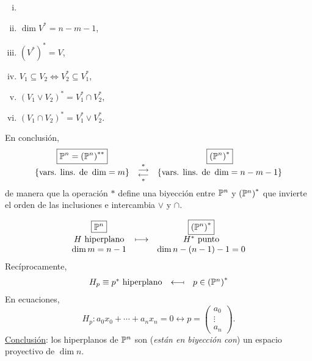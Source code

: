 \begin{obs}
    \begin{enumerate}[i)]
        \item []
        \item $\dim V^* = n-m-1$,
        \item $\left(V^*\right)^*=V$,
        \item $V_1 \subseteq V_2 \iff V_2^* \subseteq V_1^*$,
        \item $\left(V_1 \vee V_2 \right)^* = V_1^* \cap V_2^*$,
        \item $\left(V_1 \cap V_2 \right) ^*=V_1^* \vee V_2^*$.
    \end{enumerate}
    \vspace{0,3cm}
    \noindent En conclusión,
    \[
        \begin{array}{ccc}
             \boxed{\mathbb{P}^n = \left(\mathbb{P}^n\right)^{**}} & & \boxed{\left( \mathbb{P}^n \right)^*}\\
             \left\{\text{vars. lins. de }\dim = m \right\} & \substack{* \\ \longrightarrow \\  \longleftarrow \\ *} & \left\{\text{vars. lins. de }\dim = n-m-1 \right\}
        \end{array}
    \]
    de manera que la operación $*$ define una biyección entre $\mathbb{P}^n$ y $\left( \mathbb{P}^n \right)^*$ que invierte el orden de las inclusiones e intercambia $\vee$ y $\cap$.
\end{obs}
\begin{obs}
    \[
        \begin{array}{ccc}
             \boxed{\mathbb{P}^n} & & \boxed{\left( \mathbb{P}^n \right)^*}\\
             H \text{ hiperplano} & \longmapsto & H^* \text{ punto}\\
             \dim m=n-1 & & \dim n-(n-1)-1=0
        \end{array}
    \]
    Recíprocamente,
    \[
        \begin{array}{ccc}
            H_p \equiv p^* \text{ hiperplano} & \longmapsfrom & p\in \left(\mathbb{P}^n\right) ^*
        \end{array}
    \]
    En ecuaciones,
    \[
        H_p \colon a_0x_0+\cdots+a_nx_n=0 \longleftrightarrow p=\begin{pmatrix} a_0 \\ \vdots \\ a_n \end{pmatrix}.
    \]
    \underline{Conclusión}: los hiperplanos de $\mathbb{P}^n$ son (\textit{están en biyección con}) un espacio proyectivo de $\dim n$.
\end{obs}

